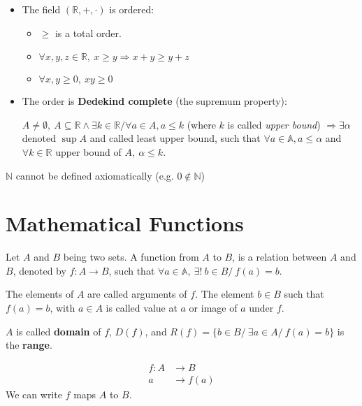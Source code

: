 \documentclass[12pt, a4paper]{book}
\begin{document}
\begin{defn}
\begin{itemize}
    \item The field $(\mathbb{R},+,\cdot)$ is ordered:
    \begin{itemize}
      \item $\geq$ is a total order.
      \item $\forall x,y,z\in\mathbb{R}, \ x\geq y \Rightarrow x+y \geq y+z$
      \item $\forall x,y \geq 0, \ xy\geq 0$
    \end{itemize}

    \item The order is \textbf{Dedekind complete} (the supremum property):
    
    $A \neq \emptyset, \ A \subseteq \mathbb{R} \wedge \exists k\in\mathbb{R} / \forall a\in A, a\leq k$ (where $k$ is called \textit{upper bound}) $\Rightarrow \exists \alpha$ denoted $\sup A$ and called least upper bound, such that $\forall a\in\mathbb{A}, a\leq\alpha$ and $\forall k\in\mathbb{R}$ upper bound of $A,\ \alpha \leq k$.
  \end{itemize}
\end{defn}

\begin{rem}
  $\mathbb{N}$ cannot be defined axiomatically (e.g. $0\notin\mathbb{N}$)
\end{rem}


\section{Mathematical Functions}

\begin{defn}
  Let $A$ and $B$ being two sets. A function from $A$ to $B$, is a relation between $A$ and $B$, denoted by $f:A\rightarrow B$, such that $\forall a\in\mathbb{A}, \ \exists!\ b\in B / \ f(a) = b$.

  The elements of $A$ are called arguments of $f$. The element $b\in B$ such that $f(a) = b$, with $a \in A$ is called value at $a$ or image of $a$ under $f$.

  $A$ is called \textbf{domain} of $f$, $D(f)$, and $R(f) = \{b\in B/\ \exists a\in A /\ f(a)=b\}$ is the \textbf{range}.
\end{defn}

\begin{notation}
  \begin{align*}
    f:A &\longrightarrow B \\
    a &\longrightarrow f(a)
  \end{align*}
  We can write $f$ maps $A$ to $B$.
\end{notation}
\end{document}
